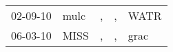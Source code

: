 \begin{supertabular}{lllll}
 02-09-10 &  mulc &  , &  , &  WATR \\
 06-03-10 &  MISS &  , &  , &  grac \\
\end{supertabular}
